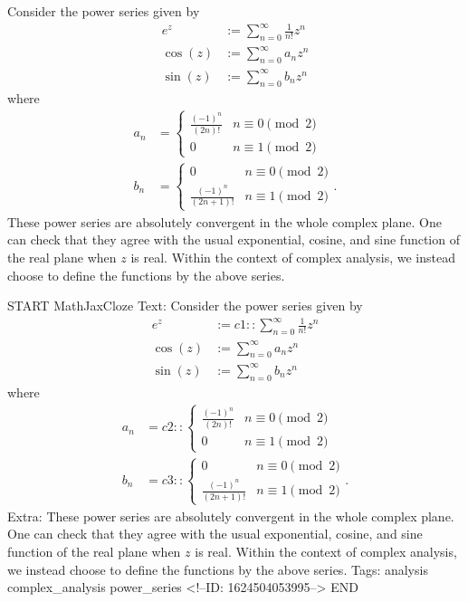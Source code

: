 \documentclass{memoir}
\begin{document}
\begin{exmp}
	Consider the power series given by
	\begin{align*}
		e^{z} &:= \sum_{n=0}^{\infty} \frac{1}{n!}z^{n}\\
		\cos (z) &:= \sum_{n=0}^{\infty} a_n z^{n}\\
		\sin (z) &:= \sum_{n=0}^{\infty} b_n z^{n}
	\end{align*}
	where
	\begin{align*}
		a_n &= \begin{cases}
			\frac{(-1)^{n}}{(2n)!} & n \equiv 0 \pmod{2} \\
			0 & n \equiv 1 \pmod{2}
		\end{cases}\\
		b_n &= \begin{cases}
			0 & n \equiv 0 \pmod{2}\\
			\frac{(-1)^{n}}{(2n+1)!} & n \equiv 1 \pmod{2}
		\end{cases}.
	\end{align*}
	These power series are absolutely convergent in the whole complex plane. One can check that they agree with the usual exponential, cosine, and sine function of the real plane when \(z\) is real. Within the context of complex analysis, we instead choose to define the functions by the above series.
\end{exmp}

\begin{anki}
START
MathJaxCloze
Text: Consider the power series given by
	\begin{align*}
		e^{z} &:= {{c1::\sum_{n=0}^{\infty} \frac{1}{n!}z^{n}}} \\
		\cos (z) &:= \sum_{n=0}^{\infty} a_n z^{n}\\
		\sin (z) &:= \sum_{n=0}^{\infty} b_n z^{n}
	\end{align*}
	where
	\begin{align*}
		a_n &= {{c2::\begin{cases}
			\frac{(-1)^{n}}{(2n)!} & n \equiv 0 \pmod{2} \\
			0 & n \equiv 1 \pmod{2}
		\end{cases} }} \\
		b_n &= {{c3::\begin{cases}
			0 & n \equiv 0 \pmod{2}\\
			\frac{(-1)^{n}}{(2n+1)!} & n \equiv 1 \pmod{2}
		\end{cases} }} .
	\end{align*}
Extra: These power series are absolutely convergent in the whole complex plane. One can check that they agree with the usual exponential, cosine, and sine function of the real plane when \(z\) is real. Within the context of complex analysis, we instead choose to define the functions by the above series.
Tags: analysis complex_analysis power_series
<!--ID: 1624504053995-->
END
\end{anki}
\end{document}
